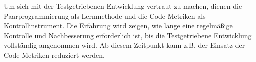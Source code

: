 Um sich mit der Testgetriebenen Entwicklung vertraut zu machen, dienen die Paarprogrammierung als Lernmethode und die Code-Metriken als Kontrollinstrument. Die Erfahrung wird zeigen, wie lange eine regelmäßige Kontrolle und Nachbesserung erforderlich ist, bis die Testgetriebene Entwicklung vollständig angenommen wird. Ab diesem Zeitpunkt kann z.B. der Einsatz der Code-Metriken reduziert werden.
